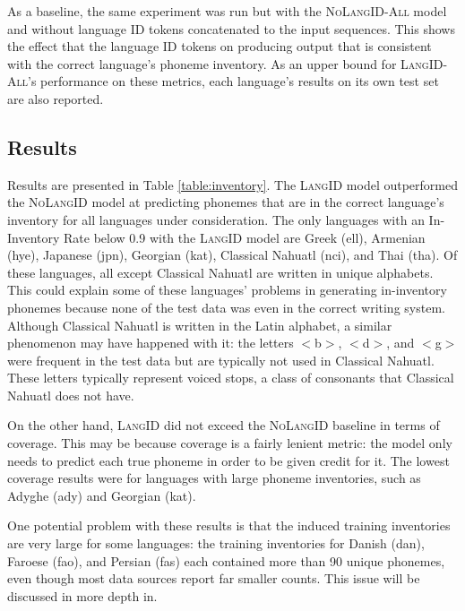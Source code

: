 As a baseline, the same experiment was run but with the \textsc{NoLangID-All} model and without language ID tokens concatenated to the input sequences. This shows the effect that the language ID tokens on producing output that is consistent with the correct language's phoneme inventory. As an upper bound for \textsc{LangID-All}'s performance on these metrics, each language's results on its own test set are also reported.

\subsection{Results}
Results are presented in Table \ref{table:inventory}. The \textsc{LangID} model outperformed the \textsc{NoLangID} model at predicting phonemes that are in the correct language's inventory for all languages under consideration. The only languages with an In-Inventory Rate below 0.9 with the \textsc{LangID} model are Greek (ell), Armenian (hye), Japanese (jpn), Georgian (kat), Classical Nahuatl (nci), and Thai (tha). Of these languages, all except Classical Nahuatl are written in unique alphabets. This could explain some of these languages' problems in generating in-inventory phonemes because none of the test data was even in the correct writing system. Although Classical Nahuatl is written in the Latin alphabet, a similar phenomenon may have happened with it: the letters $<$b$>$, $<$d$>$, and $<$g$>$ were frequent in the test data but are typically not used in Classical Nahuatl. These letters typically represent voiced stops, a class of consonants that Classical Nahuatl does not have.

On the other hand, \textsc{LangID} did not exceed the \textsc{NoLangID} baseline in terms of coverage. This may be because coverage is a fairly lenient metric: the model only needs to predict each true phoneme in order to be given credit for it. The lowest coverage results were for languages with large phoneme inventories, such as Adyghe (ady) and Georgian (kat).

One potential problem with these results is that the induced training inventories are very large for some languages: the training inventories for Danish (dan), Faroese (fao), and Persian (fas) each contained more than 90 unique phonemes, even though most data sources  report far smaller counts. This issue will be discussed in more depth in.

